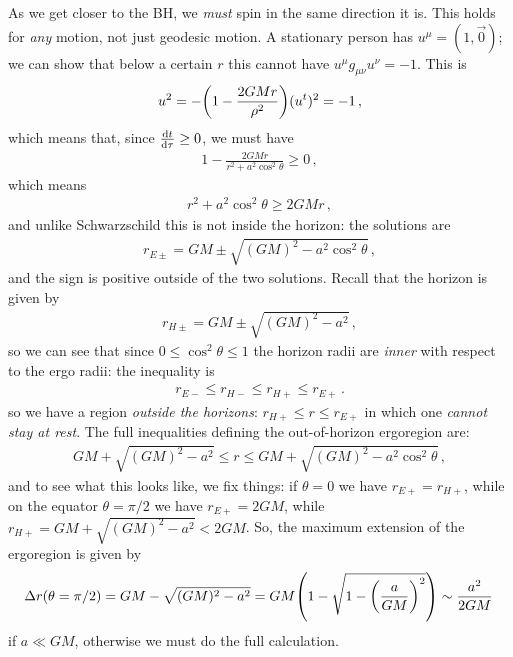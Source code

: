 \documentclass[main.tex]{subfiles}
\begin{document}
As we get closer to the BH, we \emph{must} spin in the same direction it is. 
This holds for \emph{any} motion, not just geodesic motion. A stationary person has \(u^{\mu } = (1, \vec{0})\); we can show that below a certain \(r\) this cannot have \(u^{\mu } g_{\mu \nu } u^{\nu } = -1\). This is 
%
\begin{align}
  u^2 = - \qty(1 - \frac{2GMr}{\rho^2}) (u^{t})^2 = -1
\,,
\end{align}
%
which means that, since \(\dv{t}{\tau }\geq 0\), we must have 
%
\begin{align}
  1 - \frac{2GMr}{r^2 + a^2 \cos^2 \theta } \geq 0
\,,
\end{align}
%
which means 
%
\begin{align}
  r^2 + a^2 \cos^2 \theta \geq 2GMr
\,,
\end{align}
%
and unlike Schwarzschild this is not inside the horizon: the solutions are 
%
\begin{align}
  r_{E\pm } = GM \pm \sqrt{(GM)^2 - a^2 \cos^2 \theta }
\,,
\end{align}
%
and the sign is positive outside of the two solutions. Recall that the horizon is given by  
%
\begin{align}
  r_{H \pm } = GM \pm \sqrt{(GM)^2 - a^2}
\,,
\end{align}
%
so we can see that since \(0 \leq \cos^2 \theta \leq 1\) the horizon radii are \emph{inner} with respect to the ergo radii: the inequality is 
%
\begin{align}
    r_{E-} \leq r_{H-} \leq r_{H+} \leq r_{E+}
\,.
\end{align}
%
so we have a region \emph{outside the horizons}: \(r_{H+} \leq r \leq r_{E+}\) in which one \emph{cannot stay at rest}. The full inequalities defining the out-of-horizon ergoregion are: 
%
\begin{align}
    GM + \sqrt{(GM)^2 - a^2} \leq r \leq GM + \sqrt{(GM)^2 - a^2 \cos^2 \theta }
\,,
\end{align}
%
and to see what this looks like, we fix things: if \(\theta = 0\) we have \(r_{E+}= r_{H+}\), while on the equator \(\theta = \pi /2\) we have \(r_{E+} = 2GM\), while \(r_{H+} = GM + \sqrt{(GM)^2-a^2} < 2GM\). So, the maximum extension of the ergoregion is given by 
%
\begin{align}
  \Delta r(\theta = \pi /2) = GM - \sqrt{(GM)^2 - a^2} = GM \qty(1 - \sqrt{1 - \qty(\frac{a}{GM})^2})
  \sim \frac{a^2}{2GM}
\,
\end{align}
if \(a \ll GM\), otherwise we must do the full calculation. 
\end{document}
